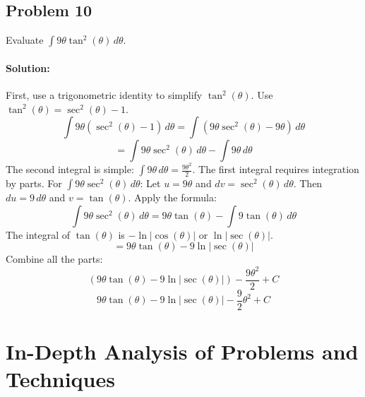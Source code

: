 \documentclass{article}
\begin{document}
\subsection{Problem 10}
Evaluate $\int 9\theta \tan^2(\theta) \, d\theta$.
\paragraph{Solution:} First, use a trigonometric identity to simplify $\tan^2(\theta)$.
Use $\tan^2(\theta) = \sec^2(\theta) - 1$.
\[ \int 9\theta (\sec^2(\theta) - 1) \, d\theta = \int (9\theta\sec^2(\theta) - 9\theta) \, d\theta \]
\[ = \int 9\theta\sec^2(\theta) \, d\theta - \int 9\theta \, d\theta \]
The second integral is simple: $\int 9\theta \, d\theta = \frac{9\theta^2}{2}$.
The first integral requires integration by parts.
For $\int 9\theta\sec^2(\theta) \, d\theta$:
Let $u = 9\theta$ and $dv = \sec^2(\theta) \, d\theta$.
Then $du = 9 \, d\theta$ and $v = \tan(\theta)$.
Apply the formula:
\[ \int 9\theta\sec^2(\theta) \, d\theta = 9\theta\tan(\theta) - \int 9\tan(\theta) \, d\theta \]
The integral of $\tan(\theta)$ is $-\ln|\cos(\theta)|$ or $\ln|\sec(\theta)|$.
\[ = 9\theta\tan(\theta) - 9\ln|\sec(\theta)| \]
Combine all the parts:
\[ (9\theta\tan(\theta) - 9\ln|\sec(\theta)|) - \frac{9\theta^2}{2} + C \]
\[ \boxed{9\theta\tan(\theta) - 9\ln|\sec(\theta)| - \frac{9}{2}\theta^2 + C} \]

\section{In-Depth Analysis of Problems and Techniques}
\end{document}
